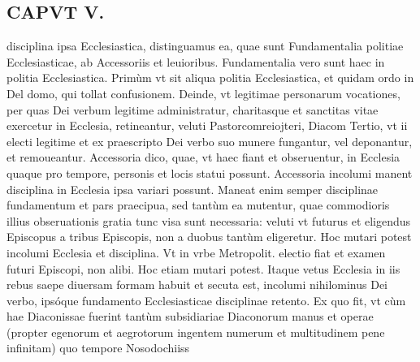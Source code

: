 \documentclass{article}
\begin{document}
\begin{pages}
\section*{CAPVT  V. }
\marginpar{[ p.289 ]}\pstart disciplina ipsa Ecclesiastica, distinguamus ea, quae sunt Fundamentalia politiae Ecclesiasticae, ab Accessoriis et leuioribus. Fundamentalia vero sunt haec in politia Ecclesiastica. Primùm vt sit aliqua politia Ecclesiastica, et quidam ordo in Del domo, qui tollat confusionem. Deinde, vt legitimae personarum vocationes, per quas Dei verbum legitime administratur, charitasque et sanctitas vitae exercetur in Ecclesia, retineantur, veluti Pastorcomreiojteri, Diacom  \pend\pstart Tertio, vt ii electi legitime et ex praescripto Dei verbo suo munere fungantur, vel deponantur, et remoueantur.  \pend\pstart Accessoria dico, quae, vt haec fiant et obseruentur, in Ecclesia quaque pro tempore, personis et locis statui possunt. Accessoria incolumi manent disciplina in Ecclesia ipsa variari possunt. Maneat enim semper disciplinae fundamentum et pars praecipua, sed tantùm ea mutentur, quae commodioris illius obseruationis gratia tunc visa sunt necessaria: veluti vt futurus et eligendus Episcopus a tribus Episcopis, non a duobus tantùm eligeretur. Hoc mutari potest incolumi Ecclesia et disciplina. Vt in vrbe Metropolit. electio fiat et examen futuri Episcopi, non alibi. Hoc etiam mutari potest. Itaque vetus Ecclesia in iis rebus saepe diuersam formam habuit et secuta est, incolumi nihilominus Dei verbo, ipsóque fundamento Ecclesiasticae disciplinae retento. Ex quo fit, vt cùm hae Diaconissae fuerint tantùm subsidiariae Diaconorum manus et operae (propter egenorum et aegrotorum ingentem numerum et multitudinem pene infinitam) quo tempore Nosodochiiss  \pend

\end{pages}
\end{document}
